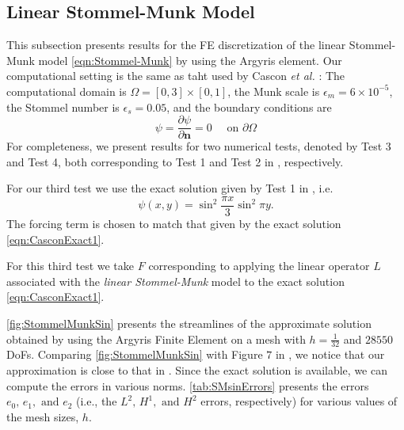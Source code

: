 \subsection{Linear Stommel-Munk Model}\label{sse:SMM}
This subsection presents results for the FE discretization of the linear
Stommel-Munk model \eqref{eqn:Stommel-Munk} by using the Argyris element. Our
computational setting is the same as taht used by Cascon \emph{et al.}
\cite{Cascon}: The computational domain is $\Omega = [0,3]\times[0,1]$, the Munk
scale is $\epsilon_m=6\times 10^{-5}$, the Stommel number is $\epsilon_s=0.05$,
and the boundary conditions are
\begin{equation} \label{eqn:SMProb}
  \psi = \frac{\partial \psi}{\partial \mathbf{n}}=0 \quad \text{ on } \partial\Omega
\end{equation}
For completeness, we present results for two numerical tests, denoted by Test 3
and Test 4, both corresponding to Test 1 and Test 2 in \cite{Cascon},
respectively.

For our third test we use the exact solution given by Test 1 in \cite{Cascon},
i.e.
\begin{equation}
  \psi(x,y) = \sin^2 \frac{\pi x}{3} \sin^2 \pi y.
  \label{eqn:CasconExact1}
\end{equation}
The forcing term is chosen to match that given by the exact solution
\eqref{eqn:CasconExact1}.

For this third test we take $F$ corresponding to applying the linear operator
$L$ associated with the \emph{linear Stommel-Munk} model to the exact solution
\eqref{eqn:CasconExact1}.

\autoref{fig:StommelMunkSin} presents the streamlines of the approximate
solution obtained by using the Argyris Finite Element on a mesh with
$h=\frac{1}{32}$ and $28550$ DoFs. Comparing \autoref{fig:StommelMunkSin} with
Figure $7$ in \cite{Myers}, we notice that our approximation is close to that in
\cite{Myers}. Since the exact solution is available, we can compute the errors
in various norms. \autoref{tab:SMsinErrors} presents the errors $e_0,\, e_1,
\text{ and } e_2$ (i.e., the $L^2,\, H^1, \text{ and } H^2$ errors,
respectively) for various values of the mesh sizes, $h$.

